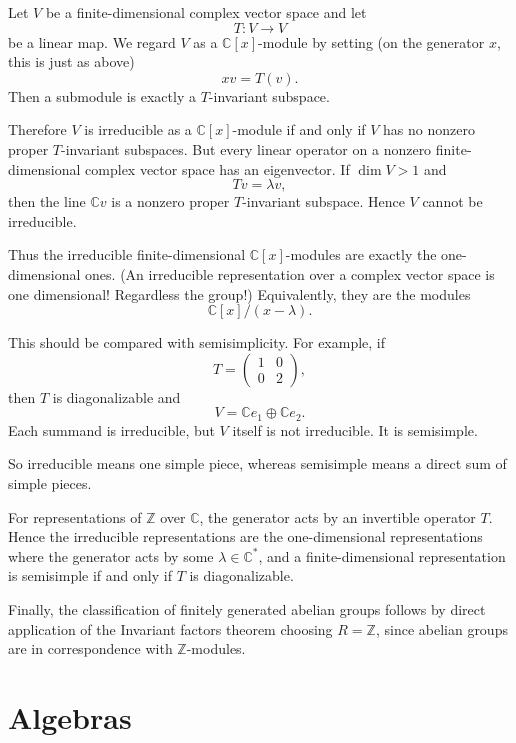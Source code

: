 \begin{example}
\label{example-irreducible-vs-semisimple-z}
Let $V$ be a finite-dimensional complex
vector space and let
$$
T:V\to V
$$
be a linear map. We regard $V$ as a
$\mathbb{C}[x]$-module by setting
(on the generator $x$,
this is just as above)
$$
xv=T(v).
$$
Then a submodule is exactly a
$T$-invariant subspace.

Therefore $V$ is irreducible as a
$\mathbb{C}[x]$-module if and only if $V$
has no nonzero proper $T$-invariant
subspaces. But every linear operator on a
nonzero finite-dimensional complex vector
space has an eigenvector. If $\dim V>1$ and
$$
Tv=\lambda v,
$$
then the line $\mathbb{C}v$ is a nonzero
proper $T$-invariant subspace. Hence $V$
cannot be irreducible.

Thus the irreducible finite-dimensional
$\mathbb{C}[x]$-modules are exactly the
one-dimensional ones.
(An irreducible representation over
a complex vector space is one dimensional!
Regardless the group!)
Equivalently, they are
the modules
$$
\mathbb{C}[x]/(x-\lambda).
$$

This should be compared with semisimplicity.
For example, if
$$
T=
\begin{pmatrix}
1&0\\
0&2
\end{pmatrix},
$$
then $T$ is diagonalizable and
$$
V=
\mathbb{C}e_1\oplus\mathbb{C}e_2.
$$
Each summand is irreducible, but $V$ itself
is not irreducible. It is semisimple.

So irreducible means one simple piece,
whereas semisimple means a direct sum of
simple pieces.

For representations of $\mathbb{Z}$ over
$\mathbb{C}$, the generator acts by an
invertible operator $T$. Hence the
irreducible representations are the
one-dimensional representations where the
generator acts by some
$\lambda\in\mathbb{C}^{*}$, and a
finite-dimensional representation is
semisimple if and only if $T$ is
diagonalizable.
\end{example}


\noindent
Finally, the classification of finitely
generated abelian groups follows by direct
application of the Invariant factors theorem
choosing $R=\mathbb{Z}$, since abelian
groups are in correspondence with
$\mathbb{Z}$-modules.



\section{Algebras}
\label{section-algebras}

